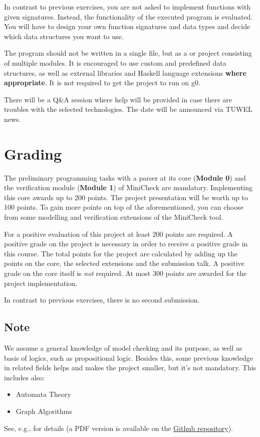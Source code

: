 \documentclass{article}
\begin{document}
In contrast to previous exercises, you are not asked to implement functions with given signatures. 
Instead, the functionality of the executed program is evaluated. 
You will have to design your own function signatures and data types and decide 
which data structures you want to use.

The program should not be written in a single file, but as a \href{https://docs.haskellstack.org/en/stable/README/}{} 
or \href{https://cabal.readthedocs.io/en/3.4/}{} project consisting of multiple modules. 
It is encouraged to use custom and predefined data structures, as well as external libraries 
and Haskell language extensions \textbf{where appropriate}. It is not required to get the project to run on g0.

There will be a Q\&A session where help will be provided in case there are troubles with the selected technologies. 
The date will be announced via TUWEL news.

\section{Grading}

The preliminary programming tasks with a parser at its core (\textbf{Module 0}) and 
the verification module (\textbf{Module 1}) of MiniCheck are mandatory. 
Implementing this core awards up to 200 points. The project presentation will be worth up to 100 points. 
To gain more points on top of the aforementioned, you can choose from some modelling 
and verification extensions of the MiniCheck tool.

For a positive evaluation of this project at least 200 points are required. 
A positive grade on the project is necessary in order to receive a positive grade in this course. 
The total points for the project are calculated by adding up the points on the core, 
the selected extensions and the submission talk. A positive grade on the core itself is \textit{not} required. 
At most 300 points are awarded for the project implementation.

In contrast to previous exercises, there is no second submission.

\subsection{Note}
We assume a general knowledge of model checking and its purpose, as well as basis of logics,
such as propositional logic.  Besides this, some previous knowledge in related fields helps 
and makes the project smaller, but it's not mandatory. This includes also:
\begin{itemize}
    \item Automata Theory
    \item Graph Algorithms
\end{itemize}
See, e.g., \cite{BaKa} for details (a PDF version is available on the 
\href{https://github.com/francescopont/MiniCheck.git}{Github repository}).
\end{document}
